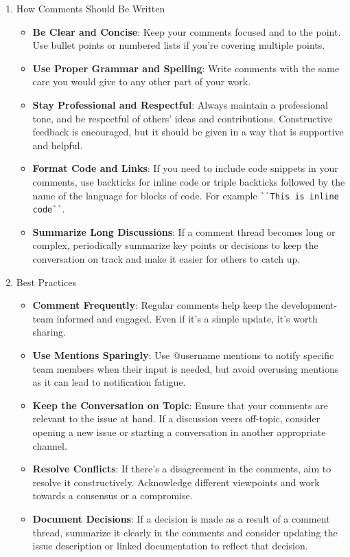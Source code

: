 \documentclass{ol-softwaremanual}
\begin{document}
\begin{enumerate}
\begin{itemize}
\end{itemize}
\item How Comments Should Be Written
\begin{itemize}
    \item \textbf{Be Clear and Concise}: Keep your comments focused and to the point. Use bullet points or numbered lists if you're covering multiple points.
    \item \textbf{Use Proper Grammar and Spelling}: Write comments with the same care you would give to any other part of your work. 
    \item \textbf{Stay Professional and Respectful}: Always maintain a professional tone, and be respectful of others’ ideas and contributions. Constructive feedback is encouraged, but it should be given in a way that is supportive and helpful.
    \item \textbf{Format Code and Links}: If you need to include code snippets in your comments, use backticks for inline code or triple backticks followed by the name of the language for blocks of code. For example \Verb#``This is inline code``#.
    \item \textbf{Summarize Long Discussions}: If a comment thread becomes long or complex, periodically summarize key points or decisions to keep the conversation on track and make it easier for others to catch up.
\end{itemize}
\item Best Practices
\begin{itemize}
    \item \textbf{Comment Frequently}: Regular comments help keep the development-team informed and engaged. Even if it’s a simple update, it’s worth sharing.
    \item \textbf{Use Mentions Sparingly}: Use @username mentions to notify specific team members when their input is needed, but avoid overusing mentions as it can lead to notification fatigue.
    \item \textbf{Keep the Conversation on Topic}: Ensure that your comments are relevant to the issue at hand. If a discussion veers off-topic, consider opening a new issue or starting a conversation in another appropriate channel.
    \item \textbf{Resolve Conflicts}: If there’s a disagreement in the comments, aim to resolve it constructively. Acknowledge different viewpoints and work towards a consensus or a compromise.
    \item \textbf{Document Decisions}: If a decision is made as a result of a comment thread, summarize it clearly in the comments and consider updating the issue description or linked documentation to reflect that decision.
\end{itemize}
\end{enumerate}
\end{document}
